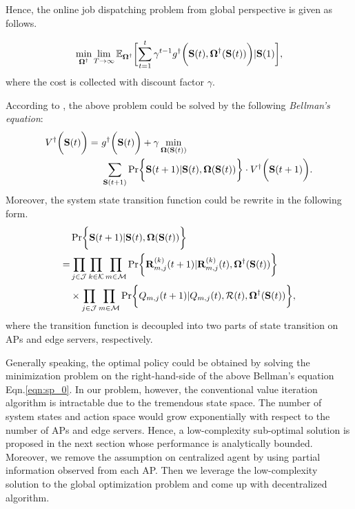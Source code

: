 Hence, the online job dispatching problem from global perspective is given as follows.
\begin{problem}
    \begin{align}
        \min_{\Policy^{\dagger}} \lim_{T \to \infty}
            \mathbb{E}_{\Policy^{\dagger}}
                \Bracket{\sum_{t=1}^t \gamma^{t-1} g^{\dagger}\Paren{\Stat(t), \Policy^{\dagger}(\Stat(t))}|\Stat(1)},
    \end{align}
    where the cost is collected with discount factor $\gamma$.
\end{problem}
According to \cite{sutton1998introduction}, the above problem could be solved by the following \emph{Bellman's equation}:
\begin{align}
    V^{\dagger}\Paren{\Stat(t)} =~&g^{\dagger}\Paren{\Stat(t)} + \gamma \min_{\Policy(\Stat(t))}
        \nonumber\\
        &\sum_{\Stat({t+1})} \Pr\Brace{ \Stat({t+1})|\Stat(t), \Policy(\Stat(t)) } \cdot V^{\dagger}\Paren{\Stat({t+1})}.
    \label{eqn:sp_0}
\end{align}
Moreover, the system state transition function could be rewrite in the following form.
\begin{align}
    & \Pr\Brace{ \Stat({t+1})|\Stat(t), \Policy(\Stat(t)) }
    \nonumber\\
    =& \prod_{j\in\jSpace}\prod_{k\in\apSet}\prod_{m\in\esSet}
            \Pr\Brace{
                \vec{R}^{(k)}_{m,j}({t+1}) | \vec{R}^{(k)}_{m,j}(t),
                \Policy^{\dagger}(\Stat(t))
            }  
        \nonumber\\
        & \times \prod_{j\in\jSpace}\prod_{m\in\esSet}
            \Pr\Brace{
                Q_{m,j}({t+1})|Q_{m,j}(t), \mathcal{R}(t), \Policy^{\dagger}(\Stat(t))
            },
\end{align}
where the transition function is decoupled into two parts of state transition on APs and edge servers, respectively.

Generally speaking, the optimal policy could be obtained by solving the minimization problem on the right-hand-side of the above Bellman's equation Eqn.\ref{eqn:sp_0}.
In our problem, however, the conventional value iteration algorithm is intractable due to the tremendous state space.
The number of system states and action space would grow exponentially with respect to the number of APs and edge servers.
Hence, a low-complexity sub-optimal solution is proposed in the next section whose performance is analytically bounded.
Moreover, we remove the assumption on centralized agent by using partial information observed from each AP.
Then we leverage the low-complexity solution to the global optimization problem and come up with decentralized algorithm.
